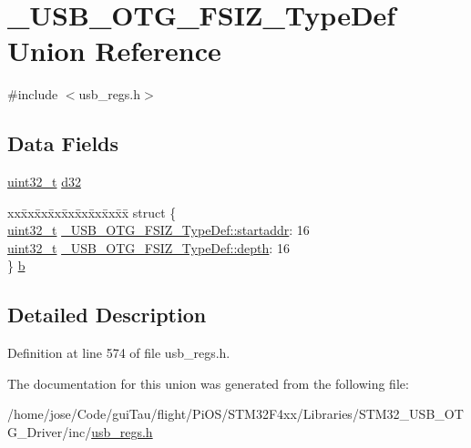 \hypertarget{union___u_s_b___o_t_g___f_s_i_z___type_def}{\section{\-\_\-\-U\-S\-B\-\_\-\-O\-T\-G\-\_\-\-F\-S\-I\-Z\-\_\-\-Type\-Def Union Reference}
\label{union___u_s_b___o_t_g___f_s_i_z___type_def}
}


{\ttfamily \#include $<$usb\-\_\-regs.\-h$>$}

\subsection*{Data Fields}
\begin{DoxyCompactItemize}
\item 
\hyperlink{stdint_8h_a435d1572bf3f880d55459d9805097f62}{uint32\-\_\-t} \hyperlink{group___u_s_b___o_t_g___d_r_i_v_e_r_ga14d845ee3d6d63ffda6e97083de02de5}{d32}
\item 
\begin{tabbing}
xx\=xx\=xx\=xx\=xx\=xx\=xx\=xx\=xx\=\kill
struct \{\\
\>\hyperlink{stdint_8h_a435d1572bf3f880d55459d9805097f62}{uint32\_t} \hyperlink{group___u_s_b___o_t_g___d_r_i_v_e_r_ga57e8b7f8a3e82860d5c7e6e95266ca71}{\_USB\_OTG\_FSIZ\_TypeDef::startaddr}: 16\\
\>\hyperlink{stdint_8h_a435d1572bf3f880d55459d9805097f62}{uint32\_t} \hyperlink{group___u_s_b___o_t_g___d_r_i_v_e_r_gaecd6fc1354e12e8da341d975571922c5}{\_USB\_OTG\_FSIZ\_TypeDef::depth}: 16\\
\} \hyperlink{group___u_s_b___o_t_g___d_r_i_v_e_r_gaa74e396b6f09634d2daa7550b339cbaa}{b}\\

\end{tabbing}\end{DoxyCompactItemize}


\subsection{Detailed Description}


Definition at line 574 of file usb\-\_\-regs.\-h.



The documentation for this union was generated from the following file\-:\begin{DoxyCompactItemize}
\item 
/home/jose/\-Code/gui\-Tau/flight/\-Pi\-O\-S/\-S\-T\-M32\-F4xx/\-Libraries/\-S\-T\-M32\-\_\-\-U\-S\-B\-\_\-\-O\-T\-G\-\_\-\-Driver/inc/\hyperlink{_s_t_m32_f4xx_2_libraries_2_s_t_m32___u_s_b___o_t_g___driver_2inc_2usb__regs_8h}{usb\-\_\-regs.\-h}\end{DoxyCompactItemize}
